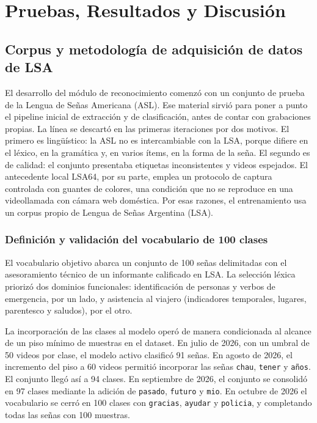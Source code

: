 \chapter{Pruebas, Resultados y Discusión}
\label{cap:pruebas_resultados_discusion}

\section{Corpus y metodología de adquisición de datos de LSA}
El desarrollo del módulo de reconocimiento comenzó con un conjunto de prueba de la Lengua de Señas Americana (ASL). Ese material sirvió para poner a punto el pipeline inicial de extracción y de clasificación, antes de contar con grabaciones propias. La línea se descartó en las primeras iteraciones por dos motivos. El primero es lingüístico: la ASL no es intercambiable con la LSA, porque difiere en el léxico, en la gramática y, en varios ítems, en la forma de la seña. El segundo es de calidad: el conjunto presentaba etiquetas inconsistentes y videos espejados. El antecedente local LSA64, por su parte, emplea un protocolo de captura controlada con guantes de colores, una condición que no se reproduce en una videollamada con cámara web doméstica. Por esas razones, el entrenamiento usa un corpus propio de Lengua de Señas Argentina (LSA).

\subsection{Definición y validación del vocabulario de 100 clases}
El vocabulario objetivo abarca un conjunto de 100 señas delimitadas con el asesoramiento técnico de un informante calificado en LSA. La selección léxica priorizó dos dominios funcionales: identificación de personas y verbos de emergencia, por un lado, y asistencia al viajero (indicadores temporales, lugares, parentesco y saludos), por el otro.

La incorporación de las clases al modelo operó de manera condicionada al alcance de un piso mínimo de muestras en el dataset. En julio de 2026, con un umbral de 50 videos por clase, el modelo activo clasificó 91 señas. En agosto de 2026, el incremento del piso a 60 videos permitió incorporar las señas \texttt{chau}, \texttt{tener} y \texttt{años}. El conjunto llegó así a 94 clases. En septiembre de 2026, el conjunto se consolidó en 97 clases mediante la adición de \texttt{pasado}, \texttt{futuro} y \texttt{mio}. En octubre de 2026 el vocabulario se cerró en 100 clases con \texttt{gracias}, \texttt{ayudar} y \texttt{policia}, y completando todas las señas con 100 muestras.

